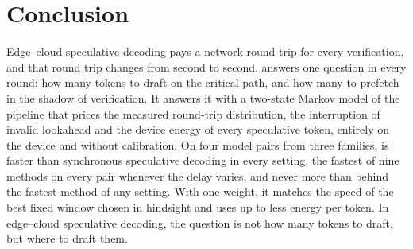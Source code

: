 \section{Conclusion}
\label{sec:conclusion}
Edge--cloud speculative decoding pays a network round trip for every verification, and that round trip changes from second to second. \cape{} answers one question in every round: how many tokens to draft on the critical path, and how many to prefetch in the shadow of verification. It answers it with a two-state Markov model of the pipeline that prices the measured round-trip distribution, the interruption of invalid lookahead and the device energy of every speculative token, entirely on the device and without calibration. On four model pairs from three families, \cape{} is  faster than synchronous speculative decoding in every setting, the fastest of nine methods on every pair whenever the delay varies, and never more than  behind the fastest method of any setting. With one weight, it matches the speed of the best fixed window chosen in hindsight and uses up to  less energy per token. In edge--cloud speculative decoding, the question is not how many tokens to draft, but where to draft them.
